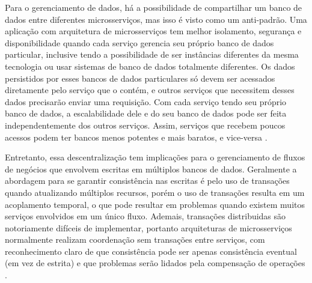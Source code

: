 Para o gerenciamento de dados, há a possibilidade de compartilhar um banco de dados entre diferentes microsserviços, mas isso é visto como um anti-padrão. Uma aplicação com arquitetura de microsserviços tem melhor isolamento, segurança e disponibilidade quando cada serviço gerencia seu próprio banco de dados particular, inclusive tendo a possibilidade de ser instâncias diferentes da mesma tecnologia ou usar sistemas de banco de dados totalmente diferentes. Os dados persistidos por esses bancos de dados particulares só devem ser acessados diretamente pelo serviço que o contém, e outros serviços que necessitem desses dados precisarão enviar uma requisição. Com cada serviço tendo seu próprio banco de dados, a escalabilidade dele e do seu banco de dados pode ser feita independentemente dos outros serviços. Assim, serviços que recebem poucos acessos podem ter bancos menos potentes e mais baratos, e vice-versa \cite{oracle_microservices,martin-fowler-microservices}.

Entretanto, essa descentralização tem implicações para o gerenciamento de fluxos de negócios que envolvem escritas em múltiplos bancos de dados. Geralmente a abordagem para se garantir consistência nas escritas é pelo uso de transações quando atualizando múltiplos recursos, porém o uso de transações resulta em um acoplamento temporal, o que pode resultar em problemas quando existem muitos serviços envolvidos em um único fluxo. Ademais, transações distribuidas são notoriamente difíceis de implementar, portanto arquiteturas de microsserviços normalmente realizam coordenação sem transações entre serviços, com reconhecimento claro de que consistência pode ser apenas consistência eventual (em vez de estrita) e que problemas serão lidados pela compensação de operações \cite{martin-fowler-microservices}. 




